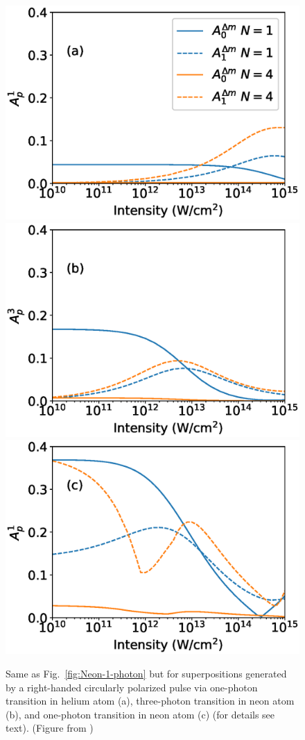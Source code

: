 \begin{figure}[!ht]
\centering
\includegraphics[width=0.32\linewidth]{figs/Photo_ionization/GAP/He_2p1.eps}
\includegraphics[width=0.32\linewidth]{figs/Photo_ionization/GAP/Ne_2p-1_3d2_3p-combined.eps}
\includegraphics[width=0.32\linewidth]{figs/Photo_ionization/GAP/Ne_2p-1_3d0_1p-combined.eps}
\caption{
Same as Fig.~\ref{fig:Neon-1-photon} but for
superpositions generated by a right-handed circularly polarized pulse
via one-photon transition in helium atom (a),  
three-photon transition in neon atom (b), and 
one-photon transition in neon atom (c) (for details see text). (Figure from \cite{venzke2020_GAP})
} 
  \label{fig:combined_data}
\end{figure}

